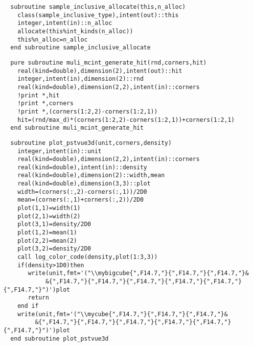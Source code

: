 \begin{Verbatim}
  subroutine sample_inclusive_allocate(this,n_alloc)
    class(sample_inclusive_type),intent(out)::this
    integer,intent(in)::n_alloc
    allocate(this%int_kinds(n_alloc))
    this%n_alloc=n_alloc
  end subroutine sample_inclusive_allocate
\end{Verbatim}
\MethodsNTB

\begin{Verbatim}
  pure subroutine muli_mcint_generate_hit(rnd,corners,hit)
    real(kind=double),dimension(2),intent(out)::hit
    integer,intent(in),dimension(2)::rnd
    real(kind=double),dimension(2,2),intent(in)::corners
    !print *,hit
    !print *,corners
    !print *,(corners(1:2,2)-corners(1:2,1))
    hit=(rnd/max_d)*(corners(1:2,2)-corners(1:2,1))+corners(1:2,1)
  end subroutine muli_mcint_generate_hit
\end{Verbatim}
  
\begin{Verbatim}
  subroutine plot_pstvue3d(unit,corners,density)
    integer,intent(in)::unit
    real(kind=double),dimension(2,2),intent(in)::corners
    real(kind=double),intent(in)::density
    real(kind=double),dimension(2)::width,mean
    real(kind=double),dimension(3,3)::plot
    width=(corners(:,2)-corners(:,1))/2D0
    mean=(corners(:,1)+corners(:,2))/2D0
    plot(1,1)=width(1)
    plot(2,1)=width(2)
    plot(3,1)=density/2D0
    plot(1,2)=mean(1)
    plot(2,2)=mean(2)
    plot(3,2)=density/2D0
    call log_color_code(density,plot(1:3,3))
    if(density>1D0)then                      
       write(unit,fmt='("\\mybigcube{",F14.7,"}{",F14.7,"}{",F14.7,"}&
            &{",F14.7,"}{",F14.7,"}{",F14.7,"}{",F14.7,"}{",F14.7,"}{",F14.7,"}")')plot
       return
    end if
    write(unit,fmt='("\\mycube{",F14.7,"}{",F14.7,"}{",F14.7,"}&
         &{",F14.7,"}{",F14.7,"}{",F14.7,"}{",F14.7,"}{",F14.7,"}{",F14.7,"}")')plot
  end subroutine plot_pstvue3d
\end{Verbatim}

